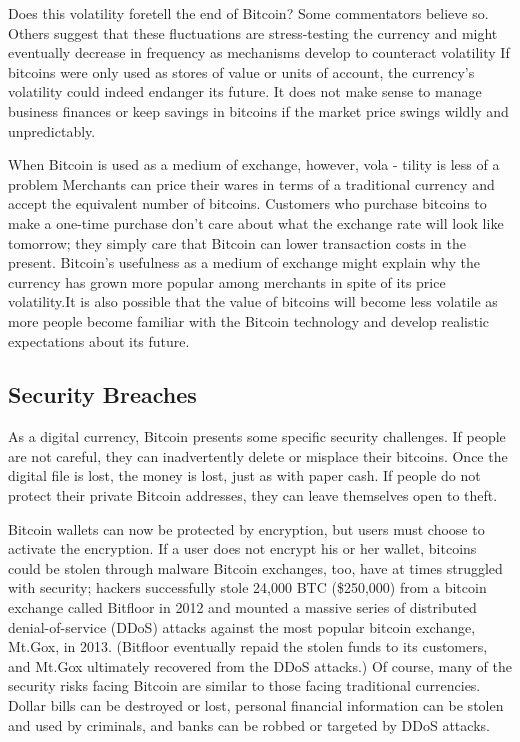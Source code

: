 Does this volatility foretell the end of Bitcoin? Some commentators
believe so. Others suggest that these fluctuations
are stress-testing the currency and might eventually decrease
in frequency as mechanisms develop to counteract volatility
If bitcoins were only used as stores of value or units of account,
the currency’s volatility could indeed endanger its future. It does
not make sense to manage business finances or keep savings in
bitcoins if the market price swings wildly and unpredictably.

When Bitcoin is used as a medium of exchange, however, vola -
tility is less of a problem Merchants can price their wares in
terms of a traditional currency and accept the equivalent number
of bitcoins. Customers who purchase bitcoins to make a one-time
purchase don’t care about what the exchange rate will look like
tomorrow; they simply care that Bitcoin can lower transaction
costs in the present. Bitcoin’s usefulness as a medium of exchange
might explain why the currency has grown more popular among
merchants in spite of its price volatility.It is also possible that
the value of bitcoins will become less volatile as more people
become familiar with the Bitcoin technology and develop realistic
expectations about its future.

\subsection{Security Breaches}
As a digital currency, Bitcoin presents some specific security challenges.
If people are not careful, they can inadvertently delete
or misplace their bitcoins. Once the digital file is lost, the money
is lost, just as with paper cash. If people do not protect their private
Bitcoin addresses, they can leave themselves open to theft.

Bitcoin wallets can now be protected by encryption, but users
must choose to activate the encryption. If a user does not encrypt
his or her wallet, bitcoins could be stolen through malware
Bitcoin exchanges, too, have at times struggled with security;
hackers successfully stole 24,000 BTC (\$250,000) from a bitcoin
exchange called Bitfloor in 2012 and mounted a massive series
of distributed denial-of-service (DDoS) attacks against the most
popular bitcoin exchange, Mt.Gox, in 2013. (Bitfloor eventually
repaid the stolen funds to its customers, and Mt.Gox ultimately
recovered from the DDoS attacks.) Of course, many of the security
risks facing Bitcoin are similar to those facing traditional currencies.
Dollar bills can be destroyed or lost, personal financial
information can be stolen and used by criminals, and banks can
be robbed or targeted by DDoS attacks.

